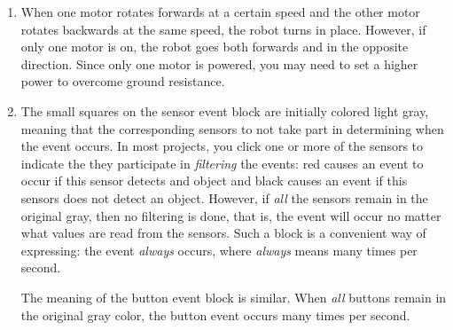 \documentclass[12pt,a4paper,english]{report}
\begin{document}
\begin{enumerate}

\item\label{e.motor} When one motor rotates forwards at a certain speed
and the other motor rotates backwards at the same speed, the robot turns
in place. However, if only one motor is on, the robot goes both forwards
and in the opposite direction. Since only one motor is powered, you may
need to set a higher power to overcome ground resistance.

\item\label{e.gray} The small squares on the sensor event block are
initially colored light gray, meaning that the corresponding sensors to
not take part in determining when the event occurs. In most projects,
you click one or more of the sensors to indicate the they participate in
\emph{filtering} the events: red causes an event to occur if this sensor
detects and object and black causes an event if this sensors does not
detect an object. However, if \emph{all} the sensors remain in the
original gray, then no filtering is done, that is, the event will occur
no matter what values are read from the sensors. Such a block is a
convenient way of expressing: the event \emph{always} occurs, where
\emph{always} means many times per second.

The meaning of the button event block is similar. When \emph{all}
buttons remain in the original gray color, the button event occurs many
times per second.

\end{enumerate}
\end{document}
